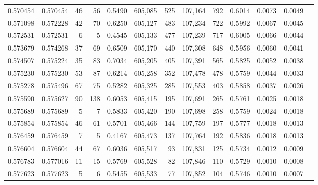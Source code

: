 \begin{tabular}{rrrrrrrrrrrrr}
0.570454 & 0.570454 &    46 &    56 &                                     0.5490 & 605,085 &     525 & 107,164 &     792 & 0.6014 & 0.0073 & 0.0049 \\
0.571098 & 0.572228 &    42 &    70 &                                     0.6250 & 605,127 &     483 & 107,234 &     722 & 0.5992 & 0.0067 & 0.0045 \\
0.572531 & 0.572531 &     6 &     5 &                                     0.4545 & 605,133 &     477 & 107,239 &     717 & 0.6005 & 0.0066 & 0.0044 \\
0.573679 & 0.574268 &    37 &    69 &                                     0.6509 & 605,170 &     440 & 107,308 &     648 & 0.5956 & 0.0060 & 0.0041 \\
0.574507 & 0.575224 &    35 &    83 &                                     0.7034 & 605,205 &     405 & 107,391 &     565 & 0.5825 & 0.0052 & 0.0038 \\
0.575230 & 0.575230 &    53 &    87 &                                     0.6214 & 605,258 &     352 & 107,478 &     478 & 0.5759 & 0.0044 & 0.0033 \\
0.575278 & 0.575496 &    67 &    75 &                                     0.5282 & 605,325 &     285 & 107,553 &     403 & 0.5858 & 0.0037 & 0.0026 \\
0.575590 & 0.575627 &    90 &   138 &                                     0.6053 & 605,415 &     195 & 107,691 &     265 & 0.5761 & 0.0025 & 0.0018 \\
0.575689 & 0.575689 &     5 &     7 &                                     0.5833 & 605,420 &     190 & 107,698 &     258 & 0.5759 & 0.0024 & 0.0018 \\
0.575854 & 0.575854 &    46 &    61 &                                     0.5701 & 605,466 &     144 & 107,759 &     197 & 0.5777 & 0.0018 & 0.0013 \\
0.576459 & 0.576459 &     7 &     5 &                                     0.4167 & 605,473 &     137 & 107,764 &     192 & 0.5836 & 0.0018 & 0.0013 \\
0.576604 & 0.576604 &    44 &    67 &                                     0.6036 & 605,517 &      93 & 107,831 &     125 & 0.5734 & 0.0012 & 0.0009 \\
0.576783 & 0.577016 &    11 &    15 &                                     0.5769 & 605,528 &      82 & 107,846 &     110 & 0.5729 & 0.0010 & 0.0008 \\
0.577623 & 0.577623 &     5 &     6 &                                     0.5455 & 605,533 &      77 & 107,852 &     104 & 0.5746 & 0.0010 & 0.0007 \\

\end{tabular}
